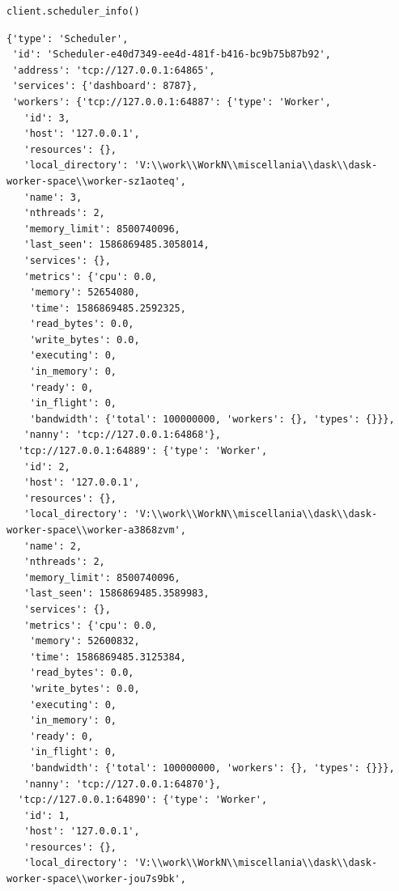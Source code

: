 \begin{lstlisting}[style=incellstyle]
client.scheduler_info()
\end{lstlisting}


\begin{lstlisting}[style=outcellstyle]
{'type': 'Scheduler',
 'id': 'Scheduler-e40d7349-ee4d-481f-b416-bc9b75b87b92',
 'address': 'tcp://127.0.0.1:64865',
 'services': {'dashboard': 8787},
 'workers': {'tcp://127.0.0.1:64887': {'type': 'Worker',
   'id': 3,
   'host': '127.0.0.1',
   'resources': {},
   'local_directory': 'V:\\work\\WorkN\\miscellania\\dask\\dask-worker-space\\worker-sz1aoteq',
   'name': 3,
   'nthreads': 2,
   'memory_limit': 8500740096,
   'last_seen': 1586869485.3058014,
   'services': {},
   'metrics': {'cpu': 0.0,
    'memory': 52654080,
    'time': 1586869485.2592325,
    'read_bytes': 0.0,
    'write_bytes': 0.0,
    'executing': 0,
    'in_memory': 0,
    'ready': 0,
    'in_flight': 0,
    'bandwidth': {'total': 100000000, 'workers': {}, 'types': {}}},
   'nanny': 'tcp://127.0.0.1:64868'},
  'tcp://127.0.0.1:64889': {'type': 'Worker',
   'id': 2,
   'host': '127.0.0.1',
   'resources': {},
   'local_directory': 'V:\\work\\WorkN\\miscellania\\dask\\dask-worker-space\\worker-a3868zvm',
   'name': 2,
   'nthreads': 2,
   'memory_limit': 8500740096,
   'last_seen': 1586869485.3589983,
   'services': {},
   'metrics': {'cpu': 0.0,
    'memory': 52600832,
    'time': 1586869485.3125384,
    'read_bytes': 0.0,
    'write_bytes': 0.0,
    'executing': 0,
    'in_memory': 0,
    'ready': 0,
    'in_flight': 0,
    'bandwidth': {'total': 100000000, 'workers': {}, 'types': {}}},
   'nanny': 'tcp://127.0.0.1:64870'},
  'tcp://127.0.0.1:64890': {'type': 'Worker',
   'id': 1,
   'host': '127.0.0.1',
   'resources': {},
   'local_directory': 'V:\\work\\WorkN\\miscellania\\dask\\dask-worker-space\\worker-jou7s9bk',

\end{lstlisting}

